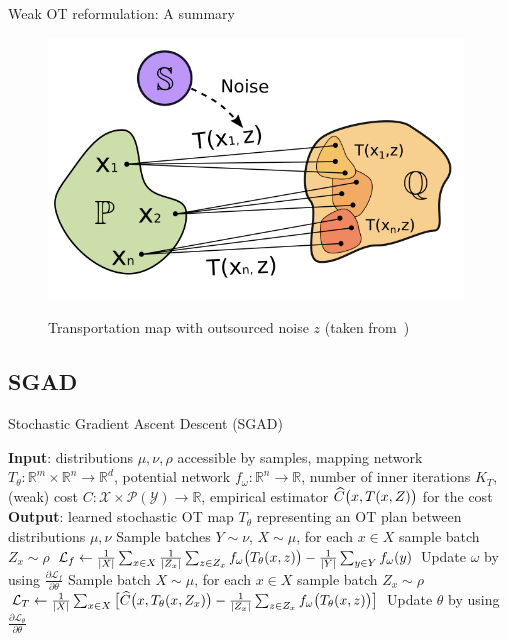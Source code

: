 \documentclass[aspectratio=169]{beamer}
\begin{document}
\begin{frame}{Weak OT reformulation: A summary}
    \begin{figure}
        \centering
        \includegraphics[width=0.6\linewidth]{figures/transportation-plan.png}
        \label{transportation-map}
        \caption{Transportation map with outsourced noise $z$ (taken from~\cite{korotin-2022})}
    \end{figure}
\end{frame}

\subsection{SGAD}
\begin{frame}{Stochastic Gradient Ascent Descent (SGAD)}
    \begin{algorithm}[H]
        \caption{\footnotesize Stochastic Gradient Ascent Descent algorithm}
        \begin{algorithmic}[1]
            \scriptsize
            \State \textbf{Input}: distributions $\mu,\nu,\rho$ accessible by samples, mapping network $T_{\theta}:\mathbb{R}^{m}\times\mathbb{R}^{n}\rightarrow\mathbb{R}^{d}$, potential network $f_{\omega}:\mathbb{R}^{n}\rightarrow\mathbb{R}$, number of inner iterations $K_{T}$, (weak) cost $C:\mathcal{X}\times\mathcal{P}(\mathcal{Y})\rightarrow\mathbb{R}$, empirical estimator $\widehat{C}\big{(}x,T(x,Z)\big{)}$ for the cost
            \State \textbf{Output}: learned stochastic OT map $T_{\theta}$ representing an OT plan between distributions $\mu,\nu$
            \Repeat
            \State Sample batches $Y\sim\nu$, $X\sim\mu$, for each $x\in X$ sample batch $Z_{x}\sim\rho$
            \State $\mathcal{L}_{f}\leftarrow\frac{1}{|X|}\sum_{x\in X}\frac{1}{|Z_{x}|}\sum_{z \in Z_{x}}f_{\omega}\big{(}T_{\theta}(x,z)\big{)}-\frac{1}{|Y|}\sum_{y\in Y}f_{ \omega}(y)$
            \State Update $\omega$ by using $\frac{\partial\mathcal{L}_{f}}{\partial\theta}$
            \State Sample batch $X\sim\mu$, for each $x\in X$ sample batch $Z_{x}\sim\rho$
            \State $\mathcal{L}_{T}\leftarrow\frac{1}{|X|}\sum_{x\in X}\big{[}\widehat{C}\big{(}x,T_{\theta}(x,Z_{x})\big{)}-\frac{1}{|Z_{x}|}\sum_{z\in Z_{x}}f_{\omega}\big{(} T_{\theta}(x,z)\big{)}\big{]}$
            \State Update $\theta$ by using $\frac{\partial\mathcal{L}_{\theta}}{\partial\theta}$
            \EndFor
        \end{algorithmic}
    \end{algorithm}
\end{frame}
\end{document}
